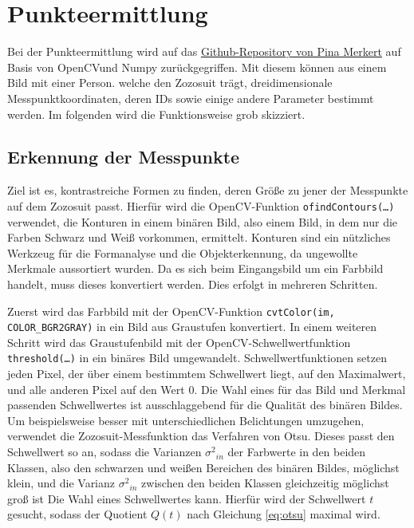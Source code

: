 \chapter{Punkteermittlung}

Bei der Punkteermittlung wird auf das \href{https://github.com/pinae/Zozo-Measurer}{Github-Repository von Pina Merkert} auf Basis von
OpenCVund Numpy zurückgegriffen. Mit diesem können aus einem Bild mit einer Person. welche den Zozosuit trägt,
dreidimensionale Messpunktkoordinaten, deren IDs sowie einige andere Parameter bestimmt werden. Im folgenden
wird die Funktionsweise grob skizziert.

\section{Erkennung der Messpunkte}
Ziel ist es, kontrastreiche Formen zu finden, deren Größe zu jener der Messpunkte auf dem Zozosuit passt. Hierfür wird die OpenCV-Funktion
\texttt{ofindContours(\dots)} verwendet, die Konturen in einem binären Bild, also einem Bild, in dem
nur die Farben Schwarz und Weiß vorkommen, ermittelt. Konturen sind ein nützliches Werkzeug für die Formanalyse und die Objekterkennung, da
ungewollte Merkmale aussortiert wurden. Da es sich beim Eingangsbild um ein Farbbild handelt,
muss dieses konvertiert werden. Dies erfolgt in mehreren Schritten. 

Zuerst wird das Farbbild mit der OpenCV-Funktion \texttt{cvtColor(im, COLOR\_BGR2GRAY)}
in ein Bild aus Graustufen konvertiert. In einem weiteren Schritt wird das Graustufenbild mit der OpenCV-Schwellwertfunktion \texttt{threshold(\dots)} in
ein binäres Bild umgewandelt. Schwellwertfunktionen setzen jeden Pixel, der über einem 
bestimmtem Schwellwert liegt, auf den Maximalwert, und alle anderen Pixel auf den Wert $0$. Die
Wahl eines für das Bild und Merkmal passenden Schwellwertes ist ausschlaggebend für die Qualität des binären Bildes.
Um beispielsweise besser mit unterschiedlichen Belichtungen umzugehen, verwendet die Zozosuit-Messfunktion
das Verfahren von Otsu. Dieses passt den Schwellwert so an, sodass die Varianzen ${\sigma^2}_{in}$ der Farbwerte in den beiden Klassen,
also den schwarzen und weißen Bereichen des binären Bildes, möglichst klein, und die Varianz ${\sigma^2}_{in}$ zwischen den beiden Klassen gleichzeitig möglichst groß ist 
Die Wahl eines Schwellwertes kann. Hierfür wird der Schwellwert $t$ gesucht, sodass der Quotient $Q(t)$ nach Gleichung 
\ref{eq:otsu} maximal wird. \cite{Opencv:2013}

